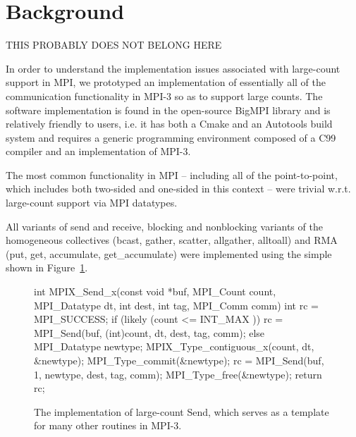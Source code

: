 
\section{Background}

THIS PROBABLY DOES NOT BELONG HERE

In order to understand the implementation issues associated with
large-count support in MPI, we prototyped an implementation of
essentially all of the communication functionality in MPI-3 so as to 
support large counts.  
The software implementation is found in the open-source BigMPI
library and is relatively friendly to users, i.e. it has both a Cmake
and an Autotools build system and requires a generic programming
environment composed of a C99 compiler and an implementation
of MPI-3.

The most common functionality in MPI -- including all of the point-to-point,
which includes both two-sided and one-sided in this context -- were
trivial w.r.t. large-count support via MPI datatypes.

All variants of send and receive, blocking and nonblocking variants of
the homogeneous collectives (bcast, gather, scatter, allgather, alltoall)
and RMA (put, get, accumulate, get\_accumulate) were implemented
using the simple shown in Figure~\ref{code:mpi_send_x}.

\begin{figure}
\begin{code}
int MPIX_Send_x(const void *buf, MPI_Count count,
                MPI_Datatype dt, int dest,
                int tag, MPI_Comm comm)
{
    int rc = MPI_SUCCESS;
    if (likely (count <= INT_MAX )) {
        rc = MPI_Send(buf, (int)count, dt, dest, tag, comm);
    } else {
        MPI_Datatype newtype;
        MPIX_Type_contiguous_x(count, dt, &newtype);
        MPI_Type_commit(&newtype);
        rc = MPI_Send(buf, 1, newtype, dest, tag, comm);
        MPI_Type_free(&newtype);
    }
    return rc;
}
\end{code}
\label{code:mpi_send_x}
\caption{The implementation of large-count Send, which serves as a template
for many other routines in MPI-3.}
\end{figure}

